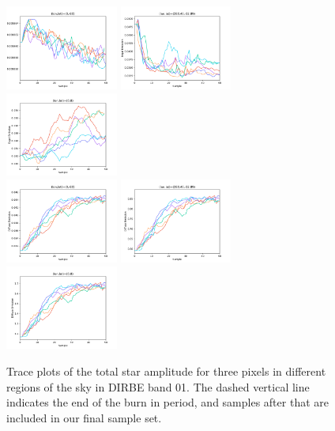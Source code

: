 \documentclass{aa}
\begin{document}
\begin{figure}
    \includegraphics[width=0.33\textwidth]{figs/mixing/exgal_trace_3121308.pdf} 
  \includegraphics[width=0.33\textwidth]{figs/mixing/exgal_trace_2429499.pdf}
  \includegraphics[width=0.33\textwidth]{figs/mixing/exgal_trace_1352704.pdf}\\
    \includegraphics[width=0.33\textwidth]{figs/mixing/diffuse_trace_3121308.pdf} 
  \includegraphics[width=0.33\textwidth]{figs/mixing/diffuse_trace_2429499.pdf}
  \includegraphics[width=0.33\textwidth]{figs/mixing/diffuse_trace_1352704.pdf}\\
  \caption{Trace plots of the total star amplitude for three pixels in different regions of the sky in DIRBE band 01. The dashed vertical line indicates the end of the burn in period, and samples after that are included in our final sample set.}
  \label{fig:amptrace}
\end{figure}
\end{document}
